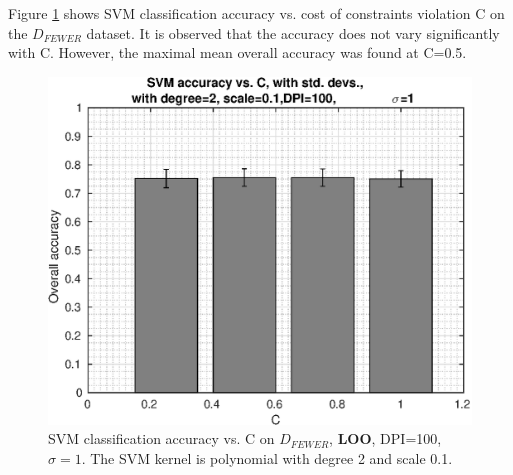 Figure \ref{fig:pca-svm-acc-vs-C} shows SVM classification accuracy vs.
cost of constraints violation C on the \(D_{FEWER}\) dataset.
It is observed that the accuracy does not vary significantly with C.
However, the maximal mean overall accuracy was found at C=0.5.
\begin{figure}[h]
\centering
\includegraphics[width=\figscale]{img/pca-svm-acc-vs-C-dpi100-sigma1}
\caption[SVM classification accuracy vs. C on $D_{FEWER}$, \textbf{LOO}.]{
SVM classification accuracy vs. C on $D_{FEWER}$, \textbf{LOO}, DPI=100, $\sigma=1$.
The SVM kernel is polynomial with degree 2 and scale 0.1.
}
\label{fig:pca-svm-acc-vs-C}
\end{figure}

